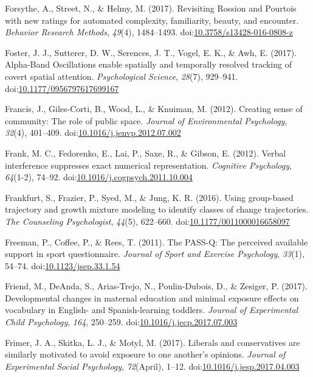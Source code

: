\documentclass[english,man]{apa6}
\begin{document}
\hypertarget{ref-Forsythe2016}{}
Forsythe, A., Street, N., \& Helmy, M. (2017). Revisiting Rossion and
Pourtois with new ratings for automated complexity, familiarity, beauty,
and encounter. \emph{Behavior Research Methods}, \emph{49}(4),
1484--1493.
doi:\href{https://doi.org/10.3758/s13428-016-0808-z}{10.3758/s13428-016-0808-z}

\hypertarget{ref-Foster2017}{}
Foster, J. J., Sutterer, D. W., Serences, J. T., Vogel, E. K., \& Awh,
E. (2017). Alpha-Band Oscillations enable spatially and temporally
resolved tracking of covert spatial attention. \emph{Psychological
Science}, \emph{28}(7), 929--941.
doi:\href{https://doi.org/10.1177/0956797617699167}{10.1177/0956797617699167}

\hypertarget{ref-Francis2012}{}
Francis, J., Giles-Corti, B., Wood, L., \& Knuiman, M. (2012). Creating
sense of community: The role of public space. \emph{Journal of
Environmental Psychology}, \emph{32}(4), 401--409.
doi:\href{https://doi.org/10.1016/j.jenvp.2012.07.002}{10.1016/j.jenvp.2012.07.002}

\hypertarget{ref-Frank2012}{}
Frank, M. C., Fedorenko, E., Lai, P., Saxe, R., \& Gibson, E. (2012).
Verbal interference suppresses exact numerical representation.
\emph{Cognitive Psychology}, \emph{64}(1-2), 74--92.
doi:\href{https://doi.org/10.1016/j.cogpsych.2011.10.004}{10.1016/j.cogpsych.2011.10.004}

\hypertarget{ref-Frankfurt2016}{}
Frankfurt, S., Frazier, P., Syed, M., \& Jung, K. R. (2016). Using
group-based trajectory and growth mixture modeling to identify classes
of change trajectories. \emph{The Counseling Psychologist},
\emph{44}(5), 622--660.
doi:\href{https://doi.org/10.1177/0011000016658097}{10.1177/0011000016658097}

\hypertarget{ref-Freeman2011}{}
Freeman, P., Coffee, P., \& Rees, T. (2011). The PASS-Q: The perceived
available support in sport questionnaire. \emph{Journal of Sport and
Exercise Psychology}, \emph{33}(1), 54--74.
doi:\href{https://doi.org/10.1123/jsep.33.1.54}{10.1123/jsep.33.1.54}

\hypertarget{ref-Friend2017}{}
Friend, M., DeAnda, S., Arias-Trejo, N., Poulin-Dubois, D., \& Zesiger,
P. (2017). Developmental changes in maternal education and minimal
exposure effects on vocabulary in English- and Spanish-learning
toddlers. \emph{Journal of Experimental Child Psychology}, \emph{164},
250--259.
doi:\href{https://doi.org/10.1016/j.jecp.2017.07.003}{10.1016/j.jecp.2017.07.003}

\hypertarget{ref-Frimer2017}{}
Frimer, J. A., Skitka, L. J., \& Motyl, M. (2017). Liberals and
conservatives are similarly motivated to avoid exposure to one another's
opinions. \emph{Journal of Experimental Social Psychology},
\emph{72}(April), 1--12.
doi:\href{https://doi.org/10.1016/j.jesp.2017.04.003}{10.1016/j.jesp.2017.04.003}
\end{document}

